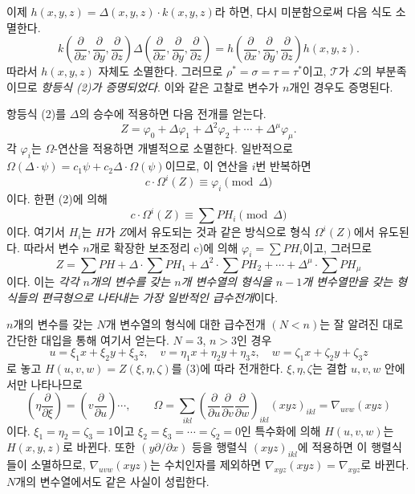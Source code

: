 이제 $h(x,y,z)=\Delta(x,y,z)\cdot k(x,y,z)$라 하면, 다시 미분함으로써 다음 식도 소멸한다.
\[
  k\!\left(\frac{\partial}{\partial x},\frac{\partial}{\partial y},\frac{\partial}{\partial z}\right)
  \Delta\!\left(\frac{\partial}{\partial x},\frac{\partial}{\partial y},\frac{\partial}{\partial z}\right)
  =
  h\!\left(\frac{\partial}{\partial x},\frac{\partial}{\partial y},\frac{\partial}{\partial z}\right)h(x,y,z).
\]
따라서 $h(x,y,z)$ 자체도 소멸한다. 그러므로 $\rho^*=\sigma=\tau=\tau^*$이고, $\mathcal T$가 $\mathcal L$의 부분족이므로 \emph{항등식 (2)가 증명되었다}. 이와 같은 고찰로 변수가 $n$개인 경우도 증명된다.

항등식 (2)를 $\Delta$의 승수에 적용하면 다음 전개를 얻는다.
\[
  Z=\varphi_0+\Delta\varphi_1+\Delta^2\varphi_2+\cdots+\Delta^\mu\varphi_\mu.
\]
각 $\varphi_i$는 $\Omega$-연산을 적용하면 개별적으로 소멸한다. 일반적으로 $\Omega(\Delta\cdot\psi)=c_1\psi+c_2\Delta\cdot\Omega(\psi)$이므로, 이 연산을 $i$번 반복하면
\[
  c\cdot \Omega^i(Z)\equiv\varphi_i\pmod{\Delta}
\]
이다. 한편 (2)에 의해
\[
  c\cdot\Omega^i(Z)\equiv\sum PH_i\pmod{\Delta}
\]
이다. 여기서 $H_i$는 $H$가 $Z$에서 유도되는 것과 같은 방식으로 형식 $\Omega^i(Z)$에서 유도된다. 따라서 변수 $n$개로 확장한 보조정리 c)에 의해 $\varphi_i=\sum PH_i$이고, 그러므로
\begin{equation}
  Z=\sum PH+\Delta\cdot\sum PH_1+\Delta^2\cdot\sum PH_2+
  \cdots+\Delta^\mu\cdot\sum PH_\mu
\tag{3}
\end{equation}
이다. 이는 \emph{각각 $n$개의 변수를 갖는 $n$개 변수열의 형식을 $n-1$개 변수열만을 갖는 형식들의 편극형으로 나타내는 가장 일반적인 급수전개}이다.

$n$개의 변수를 갖는 $N$개 변수열의 형식에 대한 급수전개 $(N<n)$는 잘 알려진 대로 간단한 대입을 통해 여기서 얻는다. $N=3$, $n>3$인 경우
\[
  u=\xi_1x+\xi_2y+\xi_3z,
  \quad v=\eta_1x+\eta_2y+\eta_3z,
  \quad w=\zeta_1x+\zeta_2y+\zeta_3z
\]
로 놓고 $H(u,v,w)=Z(\xi,\eta,\zeta)$를 (3)에 따라 전개한다. $\xi,\eta,\zeta$는 결합 $u,v,w$ 안에서만 나타나므로
\[
  \left(\eta\frac{\partial}{\partial \xi}\right)=
  \left(v\frac{\partial}{\partial u}\right)\cdots,
  \qquad
  \Omega=\sum_{ikl}\left(\frac{\partial}{\partial u}
  \frac{\partial}{\partial v}
  \frac{\partial}{\partial w}\right)_{ikl}(xyz)_{ikl}
  =\nabla_{uvw}(xyz)
\]
이다. $\xi_1=\eta_2=\zeta_3=1$이고 $\xi_2=\xi_3=\cdots=\zeta_2=0$인 특수화에 의해 $H(u,v,w)$는 $H(x,y,z)$로 바뀐다. 또한 $(y\partial/\partial x)$ 등을 행렬식 $(xyz)_{ikl}$에 적용하면 이 행렬식들이 소멸하므로, $\nabla_{uvw}(xyz)$는 수치인자를 제외하면 $\nabla_{xyz}(xyz)=\nabla_{xyz}$로 바뀐다. $N$개의 변수열에서도 같은 사실이 성립한다.

